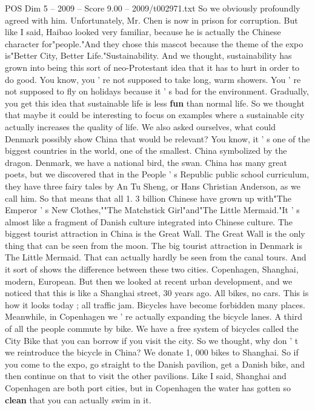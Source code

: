 \begin{textsample}{POS Dim 5 – 2009 – Score 9.00 – 2009/t002971.txt}
So we obviously profoundly agreed with him.
Unfortunately, Mr.
Chen is now in prison for corruption.
But like I said, Haibao looked very familiar, because he is actually the Chinese character for"people."And they chose this mascot because the theme of the expo is"Better City, Better Life."Sustainability.
And we thought, sustainability has grown into being this sort of neo-Protestant idea that it has to hurt in order to do good.
You know, you ' re not supposed to take long, warm showers.
You ' re not supposed to fly on holidays because it ' s bad for the environment.
Gradually, you get this idea that sustainable life is less \textbf{fun} than normal life.
So we thought that maybe it could be interesting to focus on examples where a sustainable city actually increases the quality of life.
We also asked ourselves, what could Denmark possibly show China that would be relevant?
You know, it ' s one of the biggest countries in the world, one of the smallest.
China symbolized by the dragon.
Denmark, we have a national bird, the swan.
China has many great poets, but we discovered that in the People ' s Republic public school curriculum, they have three fairy tales by An Tu Sheng, or Hans Christian Anderson, as we call him.
So that means that all 1. 3 billion Chinese have grown up with"The Emperor ' s New Clothes,""The Matchstick Girl"and"The Little Mermaid."It ' s almost like a fragment of Danish culture integrated into Chinese culture.
The biggest tourist attraction in China is the Great Wall.
The Great Wall is the only thing that can be seen from the moon.
The big tourist attraction in Denmark is The Little Mermaid.
That can actually hardly be seen from the canal tours.
And it sort of shows the difference between these two cities.
Copenhagen, Shanghai, modern, European.
But then we looked at recent urban development, and we noticed that this is like a Shanghai street, 30 years ago.
All bikes, no cars.
This is how it looks today ; all traffic jam.
Bicycles have become forbidden many places.
Meanwhile, in Copenhagen we ' re actually expanding the bicycle lanes.
A third of all the people commute by bike.
We have a free system of bicycles called the City Bike that you can borrow if you visit the city.
So we thought, why don ' t we reintroduce the bicycle in China?
We donate 1, 000 bikes to Shanghai.
So if you come to the expo, go straight to the Danish pavilion, get a Danish bike, and then continue on that to visit the other pavilions.
Like I said, Shanghai and Copenhagen are both port cities, but in Copenhagen the water has gotten so \textbf{clean} that you can actually swim in it.

\end{textsample}
